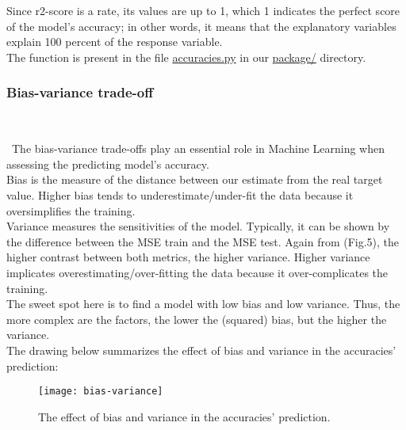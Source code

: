 Since r2-score is a rate, its values are up to 1, which 1 indicates the perfect score of the model's accuracy; in other words, it means that the explanatory variables explain 100 percent of the response variable.\\

The function is present in the file \href{https://github.com/fabiorodp/UiO-FYS-STK4155/blob/master/Project1/package/accuracies.py}{accuracies.py} in our \href{https://github.com/fabiorodp/UiO-FYS-STK4155/tree/master/Project1/package}{package/} directory.\\

\subsubsection{Bias-variance trade-off} \\
\label{chap:Bias-variance trade-off}

\quad \, The bias-variance trade-offs play an essential role in Machine Learning when assessing the predicting model's accuracy. \\

Bias is the measure of the distance between our estimate from the real target value. Higher bias tends to underestimate/under-fit the data because it oversimplifies the training. \\

Variance measures the sensitivities of the model. Typically, it can be shown by the difference between the MSE train and the MSE test. Again from (Fig.5), the higher contrast between both metrics, the higher variance. Higher variance implicates overestimating/over-fitting the data because it over-complicates the training. \\

The sweet spot here is to find a model with low bias and low variance. Thus, the more complex are the factors, the lower the (squared) bias, but the higher the variance. \\

The drawing below summarizes the effect of bias and variance in the accuracies' prediction: \\

\begin{figure}[H]
\label{fig:bias-variance}
\centering
\texttt{[image: bias-variance]}
\caption{The effect of bias and variance in the accuracies' prediction.}
\end{figure}\\

